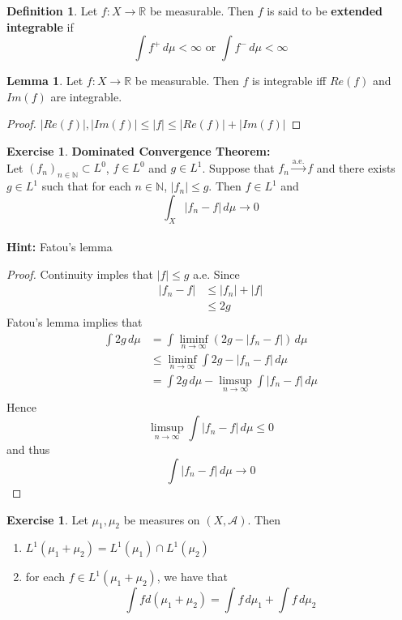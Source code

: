 \documentclass[12pt]{amsart}
\theoremstyle{definition}
\newtheorem{defn}[definition]{Definition}
\newtheorem{lem}[definition]{Lemma}
\newtheorem{ex}[definition]{Exercise}
\newcommand{\N}{\mathbb{N}}
\newcommand{\R}{\mathbb{R}}
\newcommand{\MA}{\mathcal{A}}
\newcommand{\dmu}{\, d \mu}
\newcommand{\limfn}{\liminf \limits_{n \rightarrow \infty}}
\newcommand{\limpn}{\limsup \limits_{n \rightarrow \infty}}
\newcommand{\convt}[1]{\xrightarrow{\text{#1}}}
\newcommand{\lex}[1]{\label{ex:#1}}
\newcommand{\ld}[1]{\label{defn:#1}}
\begin{document}
	\begin{defn} \ld{00000} 
		Let $f:X \rightarrow \R$ be measurable. Then $f$ is said to be \textbf{extended integrable} if $$\int f^+ \dmu  < \infty \text{ or } \int f^- \dmu < \infty$$
	\end{defn}
	
	\begin{lem}
		Let $f:X \rightarrow \R$ be measurable. Then $f$ is integrable iff $Re(f)$ and $Im(f)$ are integrable.
	\end{lem}
	
	\begin{proof}
		$|Re(f)|, |Im(f)| \leq |f| \leq |Re(f)| + |Im(f)|$
	\end{proof}
	
	\begin{ex}\textbf{Dominated Convergence Theorem:}\\
	\lex{00000}
		Let $(f_n)_{n \in \N} \subset L^0$, $f \in L^0$ and $g \in L^1$. Suppose that $f_n \convt{a.e.} f$ and there exists $g \in L^1$ such that for each $n \in \N$, $|f_n| \leq g$. Then $f \in L^1$ and $$\int_X |f_n - f| \dmu \rightarrow 0$$ \\
		\textbf{Hint:} Fatou's lemma
	\end{ex}
	
	\begin{proof}
	Continuity imples that $|f| \leq g$ a.e. Since 
	\begin{align*}
	|f_n - f| 
	&\leq |f_n| + |f| \\
	&\leq 2g
	\end{align*}	 
	Fatou's lemma implies that 
	\begin{align*}
	\int 2g \dmu 
	&= \int \limfn (2g - |f_n - f|) \dmu \\
	&\leq \limfn \int 2g - |f_n - f| \dmu  \\
	&= \int 2g \dmu - \limpn \int |f_n -f| \dmu \\
	\end{align*}
	Hence $$ \limpn \int |f_n -f| \dmu \leq 0 $$ and thus $$\int |f_n -f| \dmu \rightarrow 0$$
	\end{proof}
	
	\begin{ex} \lex{00000} 
		Let $\mu_1, \mu_2$ be measures on $(X, \MA)$. Then
		\begin{enumerate}
			\item $L^1(\mu_1 + \mu_2) = L^1(\mu_1) \cap L^1(\mu_2)$
			
			\item for each $f \in L^1(\mu_1 + \mu_2)$, we have that $$\int f d(\mu_1 + \mu_2) = \int f \dmu_1 + \int f \dmu_2$$
		\end{enumerate}
		
	\end{ex}
	
\end{document}
